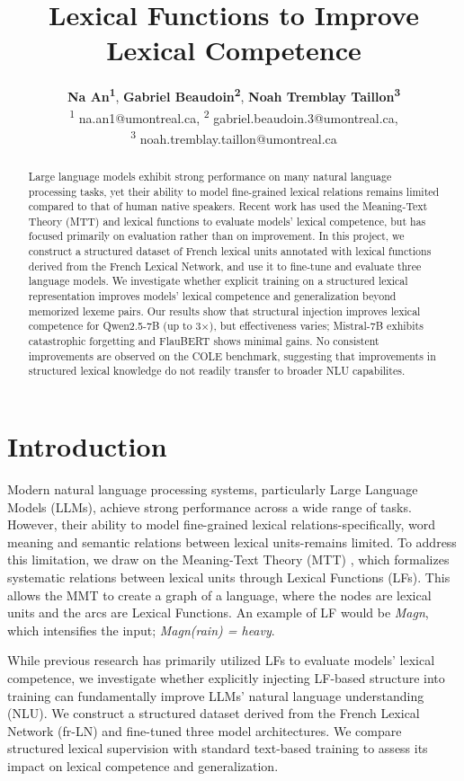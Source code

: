 \documentclass[11pt]{article}
\title{Lexical Functions to Improve Lexical Competence}
\author{
    \textbf{Na An\textsuperscript{1}},
    \textbf{Gabriel Beaudoin\textsuperscript{2}},
    \textbf{Noah Tremblay Taillon\textsuperscript{3}}
    \\
    \textsuperscript{1} na.an1@umontreal.ca,
    \textsuperscript{2} gabriel.beaudoin.3@umontreal.ca,\\
    \textsuperscript{3} noah.tremblay.taillon@umontreal.ca
    }
\begin{document}
\maketitle
\thispagestyle{plain}
\begin{abstract}
Large language models exhibit strong performance on many natural language
processing tasks, yet their ability to model fine-grained lexical relations
remains limited compared to that of human native speakers. Recent work has used 
the Meaning-Text Theory (MTT) and lexical functions to evaluate models' lexical competence, but has focused primarily on evaluation rather than
on improvement. In this project, we construct a structured dataset of French
lexical units annotated with lexical functions derived from the French Lexical
Network, and use it to fine-tune and evaluate three language models. We investigate whether explicit training on a structured lexical representation improves models' lexical competence and generalization
beyond memorized lexeme pairs. 
Our results show that structural injection improves lexical competence for Qwen2.5-7B (up to 3×), but effectiveness varies; Mistral-7B exhibits catastrophic forgetting and FlauBERT shows minimal gains. No consistent improvements are observed on the COLE benchmark, suggesting that improvements in structured lexical knowledge do not readily transfer to broader NLU capabilites.
\end{abstract}

\section{Introduction}
Modern natural language processing systems, particularly Large Language Models (LLMs), achieve strong performance across a wide range of tasks. However, their ability to model fine-grained lexical relations-specifically, word meaning and semantic relations between lexical units-remains limited. To address this limitation, we draw on the Meaning-Text Theory (MTT) \cite{melcukVersLinguistiqueSensTexte1997}, which formalizes systematic relations between lexical units through Lexical Functions (LFs). This allows the MMT to create a graph of a language, where the nodes are lexical units and the arcs are Lexical Functions. An example of LF would be \textit{Magn}, which intensifies the input; \textit{Magn(rain) = heavy}.  

While previous research has primarily utilized LFs to evaluate models' lexical competence, we investigate whether explicitly injecting LF-based structure into training can fundamentally improve LLMs' natural language understanding (NLU). We construct a structured dataset derived from the French Lexical Network (fr-LN) and fine-tuned three model architectures. We compare structured lexical supervision with standard text-based training to assess its impact on lexical competence and generalization. 
\end{document}
